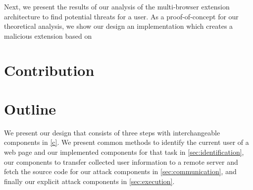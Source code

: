 	Next, we present the results of our analysis of the multi-browser extension architecture to find potential threats for a user. As a proof-of-concept for our theoretical analysis, we show our design an implementation which creates a malicious extension based on 
	
	
\section{Contribution}
\section{Outline}

	We present our design that consists of three steps with interchangeable components in \autoref{c}. We present common methods to identify the current user of a web page and our implemented components for that task in \autoref{sec:identification}, our components to transfer collected user information to a remote server and fetch the source code for our attack components in \autoref{sec:communication}, and finally our explicit attack components in \autoref{sec:execution}.